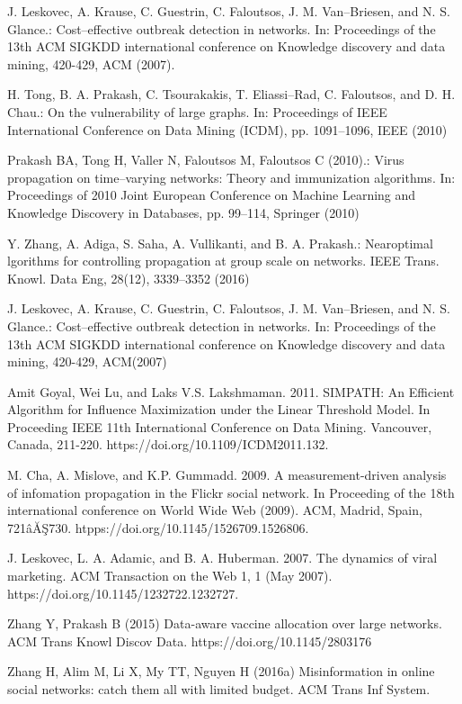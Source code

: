 \begin{thebibliography}{4}
	 J. Leskovec, A. Krause, C. Guestrin, C. Faloutsos, J. M. Van–Briesen, and N. S. Glance.: Cost–effective outbreak detection in networks. In: Proceedings of the 13th ACM SIGKDD international conference on Knowledge discovery and data mining, 420-429, ACM (2007).
	
	 H. Tong, B. A. Prakash, C. Tsourakakis, T. Eliassi--Rad, C. Faloutsos, and D. H. Chau.: On the vulnerability of large graphs. In: Proceedings of IEEE International Conference on  Data Mining  (ICDM), pp. 1091--1096, IEEE (2010)
	
	 Prakash BA, Tong H, Valler N, Faloutsos M, Faloutsos C (2010).: Virus propagation on time--varying networks: Theory and immunization algorithms. In: Proceedings of 2010 Joint European Conference on Machine Learning and Knowledge Discovery in Databases, pp. 99--114, Springer (2010)
	
	 Y. Zhang, A. Adiga, S. Saha, A. Vullikanti, and B. A. Prakash.: Nearoptimal lgorithms for controlling propagation at group scale on networks. IEEE Trans. Knowl. Data Eng, 28(12), 3339--3352 (2016)
	
	 J. Leskovec, A. Krause, C. Guestrin, C. Faloutsos, J. M. Van--Briesen, and N. S. Glance.: Cost--effective outbreak detection in networks. In: Proceedings of the 13th ACM SIGKDD international conference on Knowledge discovery and data mining, 420-429, ACM(2007)
	
	
	 Amit Goyal, Wei Lu, and Laks V.S. Lakshmaman. 2011. SIMPATH: An Efficient Algorithm for Influence Maximization under the Linear Threshold Model. In Proceeding IEEE 11th International Conference on Data Mining. Vancouver, Canada, 211-220. https://doi.org/10.1109/ICDM2011.132.
	
	 M. Cha, A. Mislove, and K.P. Gummadd. 2009. A measurement-driven analysis of infomation propagation in the Flickr social network. In Proceeding of the 18th international conference on World Wide Web (2009). ACM, Madrid, Spain, 721âĂŞ730. htpps://doi.org/10.1145/1526709.1526806.
	
	 J. Leskovec, L. A. Adamic, and B. A. Huberman. 2007. The dynamics of viral marketing. ACM Transaction on the Web 1, 1 (May 2007). https://doi.org/10.1145/1232722.1232727. 
	
	 Zhang Y, Prakash B (2015) Data-aware vaccine allocation over large networks. ACM Trans Knowl Discov Data. https://doi.org/10.1145/2803176
	
	 Zhang H, Alim M, Li X, My TT, Nguyen H (2016a) Misinformation in online social networks: catch them all with limited budget. ACM Trans Inf System.
	
	
\end{thebibliography}